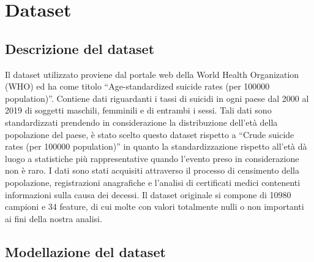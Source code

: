 \documentclass[conference]{IEEEtran}
\begin{document}
\section{Dataset}

\subsection{Descrizione del dataset}

Il dataset utilizzato proviene dal portale web della World Health Organization (WHO)
ed ha come titolo ``Age-standardized suicide rates (per 100000 population)''\cite{b4}.
Contiene dati riguardanti i tassi di suicidi in ogni paese dal 2000 al 2019 di soggetti
maschili, femminili e di entrambi i sessi. Tali dati sono standardizzati
prendendo in considerazione la distribuzione dell'età della popolazione del paese,
è stato scelto questo dataset rispetto a ``Crude suicide rates (per 100000 population)''
in quanto la standardizzazione rispetto all'età dà luogo a statistiche più rappresentative
quando l'evento preso in considerazione non è raro\cite{b5}.
I dati sono stati acquisiti attraverso il processo di censimento della popolazione,
registrazioni anagrafiche e l'analisi di certificati medici contenenti informazioni
sulla causa dei decessi.
Il dataset originale si compone di 10980 campioni e 34 feature,
di cui molte con valori totalmente nulli o non importanti ai fini della nostra analisi.

\subsection{Modellazione del dataset}
\end{document}

